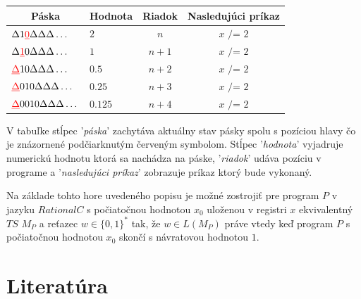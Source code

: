 \documentclass[11pt,a4paper]{article}
\newcommand{\red}[1]{\textcolor{red}{#1}}
\begin{document}
\begin{itemize}
\begin{flushright}
\begin{minipage}{0.90\textwidth}
            \begin{center}
                \begin{tabular}{l|l|c|c}
                    \multicolumn{1}{c|}{\textbf{Páska}} & \multicolumn{1}{c|}{\textbf{Hodnota}} & \multicolumn{1}{c|}{\textbf{Riadok}} & \multicolumn{1}{c}{\textbf{Nasledujúci príkaz}}\\
                    \hline
                    $\Delta 1 \red{\underbar{0}}       \Delta \Delta \Delta \dots$ & $2$     & $n$   & $x \texttt{ /= } 2$\\
                    $\Delta \red{\underbar{1}} 0       \Delta \Delta \Delta \dots$ & $1$     & $n+1$ & $x \texttt{ /= } 2$\\
                    $\red{\underbar{$\Delta$}} 1 0     \Delta \Delta \Delta \dots$ & $0.5$   & $n+2$ & $x \texttt{ /= } 2$\\
                    $\red{\underbar{$\Delta$}} 0 1 0   \Delta \Delta \Delta \dots$ & $0.25$  & $n+3$ & $x \texttt{ /= } 2$\\
                    $\red{\underbar{$\Delta$}} 0 0 1 0 \Delta \Delta \Delta \dots$ & $0.125$ & $n+4$ & $x \texttt{ /= } 2$\\
                \end{tabular}
            \end{center}

            V tabuľke stĺpec '\textit{páska}' zachytáva aktuálny stav pásky spolu s pozíciou hlavy čo je znázornené podčiarknutým červeným symbolom. Stĺpec '\textit{hodnota}' vyjadruje numerickú hodnotu ktorá sa nachádza na páske, '\textit{riadok}' udáva pozíciu v programe a '\textit{nasledujúci príkaz}' zobrazuje príkaz ktorý bude vykonaný.
        \end{minipage}
        \end{flushright}
\end{itemize}

Na základe tohto hore uvedeného popisu je možné zostrojiť pre program $P$ v jazyku $RationalC$ s počiatočnou hodnotou $x_0$ uloženou v registri $x$ ekvivalentný $TS$ $M_P$ a reťazec $w \in \{0,1\}^*$ tak, že $w \in L(M_P)$ práve vtedy keď program $P$ s počiatočnou hodnotou $x_0$ skončí s návratovou hodnotou $1$.

\newpage
\section{Literatúra} %


\begin{flushleft}
    
\end{flushleft}
\end{document}
